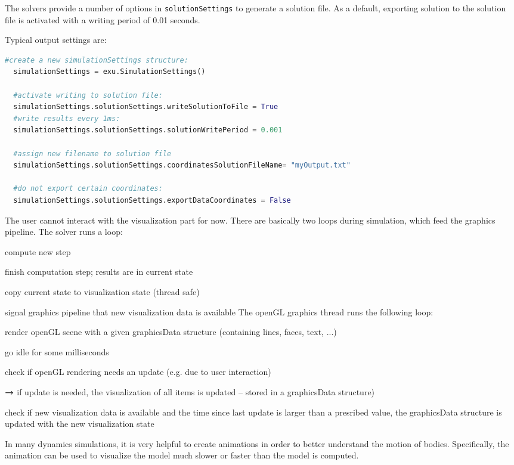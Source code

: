 %
The solvers provide a number of options in \texttt{solutionSettings} to generate a solution file. As a default, exporting solution to the solution file is activated with a writing period of 0.01 seconds.

Typical output settings are:
\pythonstyle
\begin{lstlisting}[language=Python, firstnumber=1]
  #create a new simulationSettings structure:
  simulationSettings = exu.SimulationSettings()
	
  #activate writing to solution file:
  simulationSettings.solutionSettings.writeSolutionToFile = True
  #write results every 1ms:
  simulationSettings.solutionSettings.solutionWritePeriod = 0.001
  
  #assign new filename to solution file
  simulationSettings.solutionSettings.coordinatesSolutionFileName= "myOutput.txt"

  #do not export certain coordinates:
  simulationSettings.solutionSettings.exportDataCoordinates = False
\end{lstlisting}


The user cannot interact with the visualization part for now.
There are basically two loops during simulation, which feed the graphics pipeline.
The solver runs a loop:
\bi
  \item compute new step
	\item finish computation step; results are in current state
	\item copy current state to visualization state (thread safe)
	\item signal graphics pipeline that new visualization data is available
\ei
The openGL graphics thread runs the following loop:
\bi
  \item render openGL scene with a given graphicsData structure (containing lines, faces, text, ...)
  \item go idle for some milliseconds
	\item check if openGL rendering needs an update (e.g. due to user interaction)
	\item[] $\rightarrow$ if update is needed, the visualization of all items is updated -- stored in a graphicsData structure)
	\item check if new visualization data is available and the time since last update is larger than a presribed value, the graphicsData structure is updated with the new visualization state
\ei

%
In many dynamics simulations, it is very helpful to create animations in order to better understand the motion of bodies. Specifically, the animation can be used to visualize the model much slower or faster than the model is computed.

